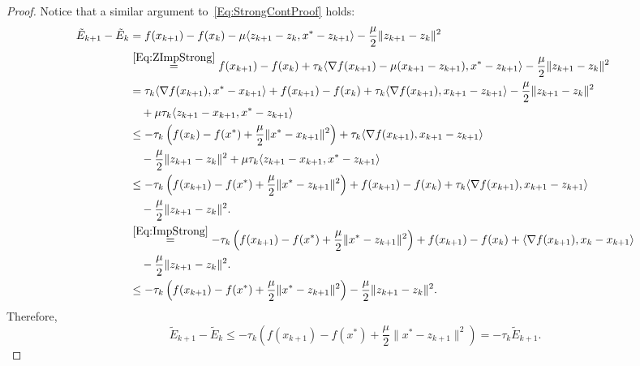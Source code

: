 \documentclass[11pt]{article}
\theoremstyle{plain}
\begin{document}
\begin{proof}
Notice that a similar argument to~\eqref{Eq:StrongContProof} holds:
\begin{subequations}
\begin{align*}
\tilde E_{k+1} -\tilde  E_k & =  f(x_{k+1}) - f(x_k) - \mu\langle z_{k+1} - z_k, x^\ast - z_{k+1}\rangle - \frac{\mu}{2} \|z_{k+1} - z_k\|^2 \\
&\overset{\eqref{Eq:ZImpStrong}}{=}  f(x_{k+1}) - f(x_k)+  \tau_k \langle  \nabla f(x_{k+1}) -\mu(x_{k+1} - z_{k+1}), x^\ast - z_{k+1}\rangle  - \frac{\mu}{2} \|z_{k+1} - z_k\|^2\\
&=   \tau_k \langle  \nabla f(x_{k+1}), x^\ast - x_{k+1}\rangle  + f(x_{k+1}) - f(x_k) + \tau_k \langle  \nabla f(x_{k+1}),x_{k+1} - z_{k+1}\rangle - \frac{\mu}{2} \|z_{k+1} - z_k\|^2\\
&\quad+\mu \tau_k\langle z_{k+1} - x_{k+1}, x^\ast - z_{k+1}\rangle\\
&\leq    -\tau_k\left (f(x_k) - f(x^\ast) + \frac{\mu}{2}\|x^\ast - x_{k+1}\|^2\right)   +\tau_k \langle  \nabla f(x_{k+1}),x_{k+1} - z_{k+1}\rangle   \\
&\quad-\frac{\mu}{2} \|z_{k+1} - z_k\|^2 + \mu \tau_k\langle z_{k+1} - x_{k+1}, x^\ast - z_{k+1}\rangle \\
& \leq - \tau_k \left( f(x_{k+1}) - f(x^\ast) + \frac{\mu}{2}\|x^\ast - z_{k+1}\|^2\right) + f(x_{k+1}) - f(x_k) + \tau_k \langle \nabla f(x_{k+1}), x_{k+1} - z_{k+1}\rangle\\
&\quad  - \frac{\mu}{2} \|z_{k+1} - z_k\|^2. \\
& \overset{\eqref{Eq:ImpStrong}}{=}   - \tau_k \left( f(x_{k+1}) - f(x^\ast) + \frac{\mu}{2}\|x^\ast - z_{k+1}\|^2\right)+  f(x_{k+1}) - f(x_k)+\langle \nabla f(x_{k+1}), x_k - x_{k+1}\rangle\\
&\quad  - \frac{\mu}{2} \|z_{k+1} - z_k\|^2. \\
& \leq  - \tau_k \left( f(x_{k+1}) - f(x^\ast) + \frac{\mu}{2}\|x^\ast - z_{k+1}\|^2\right) - \frac{\mu}{2} \|z_{k+1} - z_k\|^2. 
\end{align*}
\end{subequations}
Therefore,
\begin{equation}
\tilde E_{k+1} -\tilde  E_k \leq - \tau_k \left( f(x_{k+1}) - f(x^\ast) + \frac{\mu}{2}\|x^\ast - z_{k+1}\|^2\right) = -\tau_k \tilde E_{k+1}.
\end{equation}
\end{proof}
\end{document}
